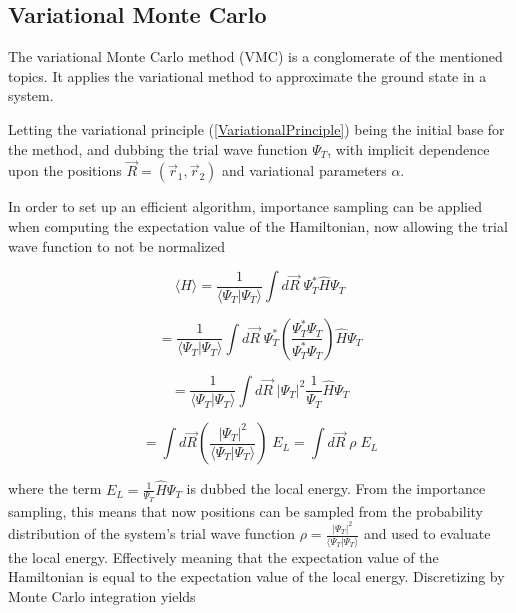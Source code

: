 \documentclass[aip,nobalancelastpage,
twocolumn,
rsi,%
 amsmath,amssymb,
 reprint,%
]{revtex4}
\begin{document}
\subsection{Variational Monte Carlo}
The variational Monte Carlo method (VMC) is a conglomerate of the mentioned topics. It applies the variational method to approximate the ground state in a system. \par
Letting the variational principle (\ref{VariationalPrinciple}) being the initial base for the method, and dubbing the trial wave function $\Psi_T$, with implicit dependence upon the positions $\vec{R}=(\vec{r}_1,\vec{r}_2)$ and variational parameters $\alpha$.\par

In order to set up an efficient algorithm, importance sampling can be applied when computing the expectation value of the Hamiltonian, now allowing the trial wave function to not be normalized 

\begin{equation*}
\langle H \rangle = \frac{1}{\langle \Psi_T | \Psi_T \rangle}\int d\vec{R} \; \Psi_T^* \hat{H} \Psi_T 
\end{equation*}

\begin{equation*}
= \frac{1}{\langle \Psi_T | \Psi_T \rangle} \int d\vec{R} \; \Psi_T^* \left(\frac{\Psi_T^* \Psi_T}{\Psi_T^* \Psi_T}\right) \hat{H}\Psi_T
\end{equation*}

\begin{equation}
= \frac{1}{\langle \Psi_T | \Psi_T \rangle} \int d\vec{R} \; \left| \Psi_T\right|^2 \frac{1}{\Psi_T}\hat{H}\Psi_T 
\end{equation}

\begin{equation}
=  \int d\vec{R}\left(\frac{\left|\Psi_T\right|^2}{\langle \Psi_T | \Psi_T \rangle}\right)\; E_L = \int d\vec{R}\; \rho\;E_L
\end{equation}

where the term $E_L = \frac{1}{\Psi_T}\hat{H} \Psi_T$ is dubbed the local energy. From the importance sampling, this means that now positions can be sampled from the probability distribution of the system's trial wave function $\rho = \frac{\left|\Psi_T\right|^2}{\langle \Psi_T|\Psi_T\rangle}$ and used to evaluate the local energy. Effectively meaning that the expectation value of the Hamiltonian is equal to the expectation value of the local energy. Discretizing by Monte Carlo integration yields
\end{document}
